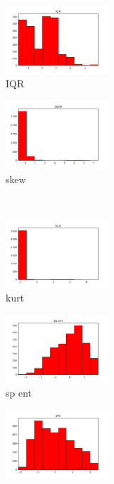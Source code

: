 \documentclass[a4paper]{article}    %
\begin{document}
\begin{figure}[H]
\begin{subfigure}{0.32\textwidth}
        \includegraphics[width=3.85cm]{std_4_IQR}
        \caption{IQR}
        \label{fig:sub_std_5}
    \end{subfigure}\hfill
    \begin{subfigure}{0.32\textwidth}
        \centering
        \includegraphics[width=3.85cm]{std_5_skew}
        \caption{skew}
        \label{fig:sub_std_6}
    \end{subfigure}
    \\
    \begin{subfigure}{0.32\textwidth}
        \centering
        \includegraphics[width=3.85cm]{std_6_kurt}
        \caption{kurt}
        \label{fig:sub_std_7}
    \end{subfigure}\hfill
    \begin{subfigure}{0.32\textwidth}
        \centering
        \includegraphics[width=3.85cm]{std_7_sp_ent}
        \caption{sp ent}
        \label{fig:sub_std_8}
    \end{subfigure}\hfill
    \begin{subfigure}{0.32\textwidth}
        \centering
        \includegraphics[width=3.85cm]{std_8_sfm}

\end{subfigure}
\end{figure}
\end{document}

